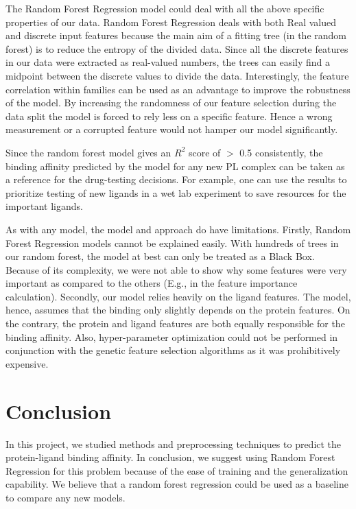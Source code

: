 \documentclass[11pt]{article}
\begin{document}
The Random Forest Regression model could deal with all the above specific properties of our data.
Random Forest Regression deals with both Real valued and discrete input features because the main aim of a fitting tree (in the random forest) is to reduce the entropy of the divided data.
Since all the discrete features in our data were extracted as real-valued numbers,  the trees can easily find a midpoint between the discrete values to divide the data. 
Interestingly,  the feature correlation within families can be used as an advantage to improve the robustness of the model. 
By increasing the randomness of our feature selection during the data split the model is forced to rely less on a specific feature.
Hence a wrong measurement or a corrupted feature would not hamper our model significantly.

Since the random forest model gives an $R^2$ score of $>$ 0.5 consistently,  the binding affinity predicted by the model for any new PL complex can be taken as a reference for the drug-testing decisions.
For example,  one can use the results to prioritize testing of new ligands in a wet lab experiment to save resources for the important ligands.

As with any model,  the model and approach do have limitations. 
Firstly, Random Forest Regression models cannot be explained easily.
With hundreds of trees in our random forest, the model at best can only be treated as a Black Box.
Because of its complexity,  we were not able to show why some features were very important as compared to the others (E.g., in the feature importance calculation).
Secondly, our model relies heavily on the ligand features. 
The model, hence, assumes that the binding only slightly depends on the protein features. On the contrary, the protein and ligand features are both equally responsible for the binding affinity.
Also,  hyper-parameter optimization could not be performed
in conjunction with the genetic feature selection algorithms as it was prohibitively expensive.

\section{Conclusion}
In this project, we studied methods and preprocessing techniques to predict the protein-ligand binding affinity.
In conclusion, we suggest using Random Forest Regression for this problem because of the ease of training and the generalization capability.
We believe that a random forest regression could be used as a baseline to compare any new models.
\end{document}
